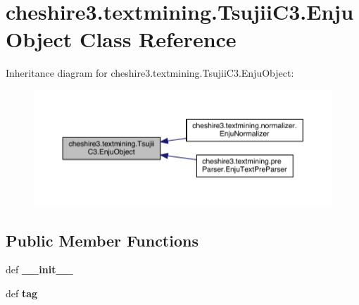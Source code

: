 \hypertarget{classcheshire3_1_1textmining_1_1_tsujii_c3_1_1_enju_object}{\section{cheshire3.\-textmining.\-Tsujii\-C3.\-Enju\-Object Class Reference}
\label{classcheshire3_1_1textmining_1_1_tsujii_c3_1_1_enju_object}
}


Inheritance diagram for cheshire3.\-textmining.\-Tsujii\-C3.\-Enju\-Object\-:
\nopagebreak
\begin{figure}[H]
\begin{center}
\leavevmode
\includegraphics[width=350pt]{classcheshire3_1_1textmining_1_1_tsujii_c3_1_1_enju_object__inherit__graph}
\end{center}
\end{figure}
\subsection*{Public Member Functions}
\begin{DoxyCompactItemize}
\item 
\hypertarget{classcheshire3_1_1textmining_1_1_tsujii_c3_1_1_enju_object_ab65e1d7be8370d3878c3190178fce490}{def {\bfseries \-\_\-\-\_\-init\-\_\-\-\_\-}}\label{classcheshire3_1_1textmining_1_1_tsujii_c3_1_1_enju_object_ab65e1d7be8370d3878c3190178fce490}

\item 
\hypertarget{classcheshire3_1_1textmining_1_1_tsujii_c3_1_1_enju_object_a7424578e75c72a7e56aea1cec65d1aa5}{def {\bfseries tag}}\label{classcheshire3_1_1textmining_1_1_tsujii_c3_1_1_enju_object_a7424578e75c72a7e56aea1cec65d1aa5}

\end{DoxyCompactItemize}
